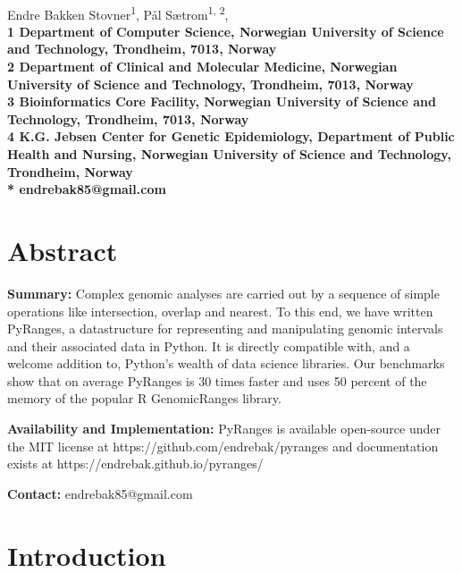 \documentclass[10pt,letterpaper]{article}
\begin{document}
\vspace*{0.35in}

\begin{flushleft}
{\Large
  \textbf{}
}
\newline
\\
Endre Bakken Stovner\textsuperscript{1},
Pål Sætrom\textsuperscript{1, 2},
\\
\bf{1} Department of
  Computer Science, Norwegian University
  of Science and Technology, Trondheim, 7013, Norway
\\
\bf{2} Department of Clinical and Molecular Medicine, Norwegian
  University of Science and Technology, Trondheim, 7013, Norway
\\
\bf{3} Bioinformatics Core Facility, Norwegian University of Science and
Technology, Trondheim, 7013, Norway
\\
\bf{4} K.G. Jebsen Center for Genetic Epidemiology, Department of Public Health
and Nursing, Norwegian University of Science and Technology, Trondheim, Norway
\\
\bigskip
* endrebak85@gmail.com

\end{flushleft}

\section*{Abstract}

\textbf{Summary:} Complex genomic analyses are carried out by a sequence of
simple operations like intersection, overlap and nearest. To this end, we have
written PyRanges, a datastructure for representing and manipulating genomic
intervals and their associated data in Python. It is directly compatible with,
and a welcome addition to, Python's wealth of data science libraries. Our
benchmarks show that on average PyRanges is 30 times faster and uses 50 percent
of the memory of the popular R GenomicRanges library.

\textbf{Availability and Implementation:} PyRanges is available open-source under
the MIT license at https://github.com/endrebak/pyranges and documentation exists
at https://endrebak.github.io/pyranges/

\textbf{Contact:} endrebak85@gmail.com

\section*{Introduction}
\end{document}
